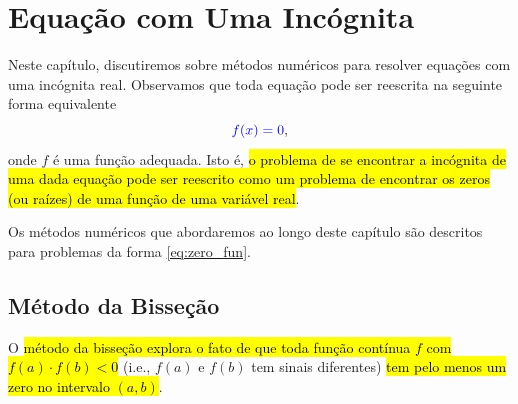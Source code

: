 
\chapter{Equação com Uma Incógnita}\label{cap_eq1d}

Neste capítulo, discutiremos sobre métodos numéricos para resolver equações com uma incógnita real. Observamos que toda equação pode ser reescrita na seguinte forma equivalente
\begin{equation}\label{eq:zero_fun}
  {\color{blue}f(x) = 0},
\end{equation}
onde $f$ é uma função adequada. Isto é, \hl{o problema de se encontrar a incógnita de uma dada equação pode ser reescrito como um problema de encontrar os zeros (ou raízes) de uma função de uma variável real}.

Os métodos numéricos que abordaremos ao longo deste capítulo são descritos para problemas da forma \eqref{eq:zero_fun}.

\section{Método da Bisseção}\label{cap_eq1d_sec_bissec}

O \hl{método da bisseção explora o fato de que toda função contínua $f$ com $f(a)\cdot f(b) < 0$} (i.e., $f(a)$ e $f(b)$ tem sinais diferentes) \hl{tem pelo menos um zero no intervalo $(a, b)$}.

